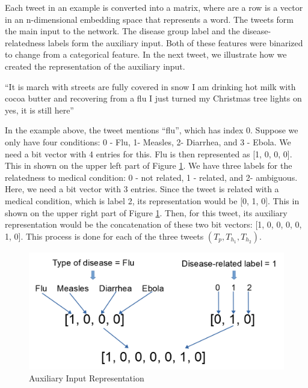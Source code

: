 \documentclass[12pt]{report}
\begin{document}
Each tweet in an example is converted into a matrix, where are a row is a vector in an n-dimensional embedding space that represents a word. The tweets form the 
main input to the network.
The disease group label and the disease-relatedness labels form the auxiliary input. Both of these features were binarized to change from a  categorical feature.
 In the next tweet,  we illustrate how we created the representation of the auxiliary input.

\begin{definition}
	``It is march with streets are fully covered in snow I am drinking hot milk with cocoa butter and recovering from a flu I just turned my Christmas tree lights on yes, it is still here''
\end{definition}

In the example above, the tweet mentions ``flu'', which has index 0. Suppose we only have four conditions: 0 - Flu, 1- Measles, 2- Diarrhea, and  3 - Ebola.  
We  need a bit vector with 4 entries for this. Flu is then represented 
as [1, 0, 0, 0].  This in shown on the upper left part of  Figure \ref{figure:categorical}. We have three labels for the relatedness to medical condition: 0 - not related, 1 - related, and 2- ambiguous. Here, we need a bit vector with 3 entries. Since the tweet is related with a medical condition, which is label 2, its representation 
would be [0, 1, 0]. This in shown on the upper right part of  Figure \ref{figure:categorical}. Then, for this tweet, its auxiliary representation would be the concatenation of these two bit vectors: [1, 0, 0, 0, 0, 1, 0]. This process is done
for each of the three tweets $(T_p, T_{h_1},T_{h_2})$.

\begin{figure}[H]	
	\centering
	\includegraphics[width=130mm, scale = 1]{images/10_categorical.png}	
	\caption{Auxiliary Input Representation}	
	\label{figure:categorical}
\end{figure}
\end{document}

